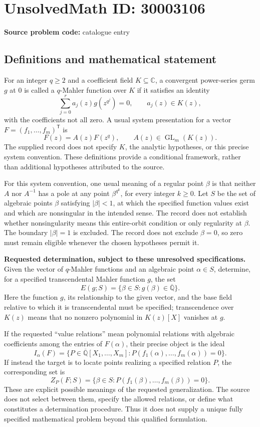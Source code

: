 \documentclass[11pt]{article}
\newcommand{\Q}{\mathbb{Q}}
\newcommand{\C}{\mathbb{C}}
\begin{document}
\section*{UnsolvedMath ID: 30003106}
\textbf{Source problem code:} catalogue entry
\subsection{Definitions and mathematical statement}
For an integer \(q\geq 2\) and a coefficient field \(K\subseteq\C\), a convergent power-series germ \(g\) at \(0\) is called a \(q\)-Mahler function over \(K\) if it satisfies an identity
\[
\sum_{j=0}^{r}a_j(z)g(z^{q^j})=0,
\qquad a_j(z)\in K(z),
\]
with the coefficients not all zero. A usual system presentation for a vector \(F=(f_1,\ldots,f_m)^{\mathsf T}\) is
\[
F(z)=A(z)F(z^q),\qquad A(z)\in\operatorname{GL}_m(K(z)).
\]
The supplied record does not specify \(K\), the analytic hypotheses, or this precise system convention. These definitions provide a conditional framework, rather than additional hypotheses attributed to the source.

For this system convention, one usual meaning of a regular point \(\beta\) is that neither \(A\) nor \(A^{-1}\) has a pole at any point \(\beta^{q^k}\), for every integer \(k\geq0\). Let \(S\) be the set of algebraic points \(\beta\) satisfying \(|\beta|<1\), at which the specified function values exist and which are nonsingular in the intended sense. The record does not establish whether nonsingularity means this entire-orbit condition or only regularity at \(\beta\). The boundary \(|\beta|=1\) is excluded. The record does not exclude \(\beta=0\), so zero must remain eligible whenever the chosen hypotheses permit it.

\textbf{Requested determination, subject to these unresolved specifications.} Given the vector of \(q\)-Mahler functions and an algebraic point \(\alpha\in S\), determine, for a specified transcendental Mahler function \(g\), the set
\[
E(g;S)=\{\beta\in S:g(\beta)\in\overline{\Q}\}.
\]
Here the function \(g\), its relationship to the given vector, and the base field relative to which it is transcendental must be specified; transcendence over \(K(z)\) means that no nonzero polynomial in \(K(z)[X]\) vanishes at \(g\).

If the requested ``value relations'' mean polynomial relations with algebraic coefficients among the entries of \(F(\alpha)\), their precise object is the ideal
\[
I_{\alpha}(F)=\{P\in\overline{\Q}[X_1,\ldots,X_m]:
P(f_1(\alpha),\ldots,f_m(\alpha))=0\}.
\]
If instead the target is to locate points realizing a specified relation \(P\), the corresponding set is
\[
Z_P(F;S)=\{\beta\in S:P(f_1(\beta),\ldots,f_m(\beta))=0\}.
\]
These are explicit possible meanings of the requested generalization. The source does not select between them, specify the allowed relations, or define what constitutes a determination procedure. Thus it does not supply a unique fully specified mathematical problem beyond this qualified formulation.
\end{document}
